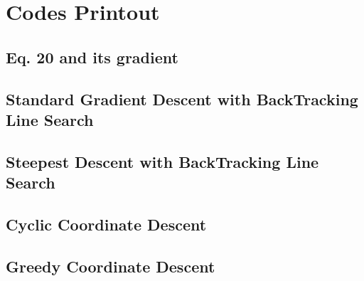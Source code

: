 \documentclass[11pt,a4paper]{article}
\begin{document}
\newpage
\appendix
\section{Codes Printout}

\subsection{Eq. 20 and its gradient}



\newpage
\subsection{Standard Gradient Descent with BackTracking Line Search}

\newpage

\subsection{Steepest Descent with BackTracking Line Search}

\newpage

\subsection{Cyclic Coordinate Descent}

\newpage

\subsection{Greedy Coordinate Descent}

\newpage
\end{document}

